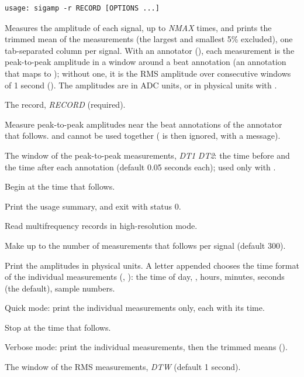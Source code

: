 \begin{lstlisting}[style=signature,language={}]
usage: sigamp -r RECORD [OPTIONS ...]
\end{lstlisting}
Measures the amplitude of each signal, up to \textit{NMAX} times, and prints the trimmed
mean of the measurements (the largest and smallest 5\% excluded), one tab-separated column
per signal. With an annotator (), each measurement is the peak-to-peak amplitude in
a window around a beat annotation (an annotation that  maps to );
without one, it is the RMS amplitude over consecutive windows of 1 second (). The
amplitudes are in ADC units, or in physical units with .
\begin{params}
\item[-r] The record, \textit{RECORD} (required).
\item[-a] Measure peak-to-peak amplitudes near the beat annotations of the annotator that
  follows.  and  cannot be used together ( is then ignored, with a
  message).
\item[-d] The window of the peak-to-peak measurements, \textit{DT1} \textit{DT2}: the time
  before and the time after each annotation (default 0.05 seconds each); used only with
  .
\item[-f] Begin at the time that follows.
\item[-h] Print the usage summary, and exit with status 0.
\item[-H] Read multifrequency records in high-resolution mode.
\item[-n] Make up to the number of measurements that follows per signal (default 300).
\item[-p] Print the amplitudes in physical units. A letter appended chooses the time
  format of the individual measurements (, ):  the time of day,
   ,  hours,  minutes,  seconds (the
  default),  sample numbers.
\item[-q] Quick mode: print the individual measurements only, each with its time.
\item[-t] Stop at the time that follows.
\item[-v] Verbose mode: print the individual measurements, then the trimmed means
  ().
\item[-w] The window of the RMS measurements, \textit{DTW} (default 1 second).
\end{params}
